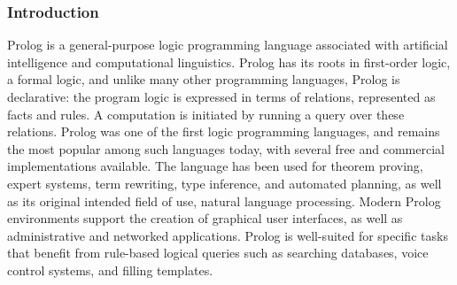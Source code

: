 \begin{frame}
    \frametitle{Introduction}
    \begin{minipage}{\textwidth}
        Prolog is a general-purpose logic programming language associated with artificial intelligence and computational linguistics.
        Prolog has its roots in first-order logic, a formal logic, and unlike many other programming languages, Prolog is declarative: the program logic is expressed in terms of relations, represented as facts and rules. A computation is initiated by running a query over these relations.
        Prolog was one of the first logic programming languages, and remains the most popular among such languages today, with several free and commercial implementations available. The language has been used for theorem proving, expert systems, term rewriting, type inference, and automated planning, as well as its original intended field of use, natural language processing. Modern Prolog environments support the creation of graphical user interfaces, as well as administrative and networked applications.
        Prolog is well-suited for specific tasks that benefit from rule-based logical queries such as searching databases, voice control systems, and filling templates.
    \end{minipage}
\end{frame}
